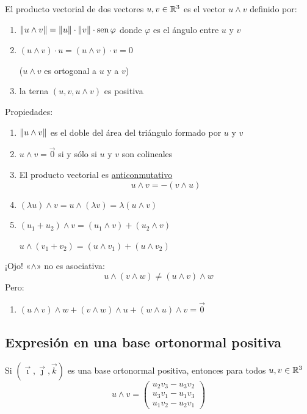 \documentclass[11pt,a4paper]{article}
\begin{document}
\begin{definicion}
El producto vectorial de dos vectores $u,v\in\mathbb{R}^3$ es el vector $u\wedge v$ definido por:
\begin{enumerate}[label=(\arabic*)]
  \item $\lVert u\wedge v\rVert=\lVert u\rVert\cdot\lVert v\rVert\cdot\operatorname{sen}\varphi$ \quad donde $\varphi$ es el ángulo entre $u$ y $v$
  \item $(u\wedge v)\cdot u=(u\wedge v)\cdot v=0$

  ($u\wedge v$ es ortogonal a $u$ y a $v$)
  \item la terna $(u,v,u\wedge v)$ es positiva
\end{enumerate}
\end{definicion}

Propiedades:
\begin{enumerate}[label=(\arabic*)]
  \item $\lVert u\wedge v\rVert$ es el doble del área del triángulo formado por $u$ y $v$
  \item $u\wedge v=\vec0$ si y sólo si $u$ y $v$ son colineales
  \item El producto vectorial es \underline{anticonmutativo}
  \[
  u\wedge v=-(v\wedge u)
  \]
  \item $(\lambda u)\wedge v=u\wedge(\lambda v)=\lambda(u\wedge v)$
  \item $(u_1+u_2)\wedge v=(u_1\wedge v)+(u_2\wedge v)$

  $u\wedge(v_1+v_2)=(u\wedge v_1)+(u\wedge v_2)$
\end{enumerate}

¡Ojo! «$\wedge$» no es asociativa:
\[
u\wedge(v\wedge w)\neq(u\wedge v)\wedge w
\]
Pero:
\begin{enumerate}[label=(\arabic*),start=6]
  \item $(u\wedge v)\wedge w+(v\wedge w)\wedge u+(w\wedge u)\wedge v=\vec0$
\end{enumerate}

\subsection{Expresión en una base ortonormal positiva}

\begin{proposicion}
Si $(\vec\imath,\vec\jmath,\vec k)$ es una base ortonormal positiva, entonces para todos $u,v\in\mathbb{R}^3$
\[
u\wedge v=\begin{pmatrix}
u_2v_3-u_3v_2\\
u_3v_1-u_1v_3\\
u_1v_2-u_2v_1
\end{pmatrix}
\]
\end{proposicion}
\end{document}
